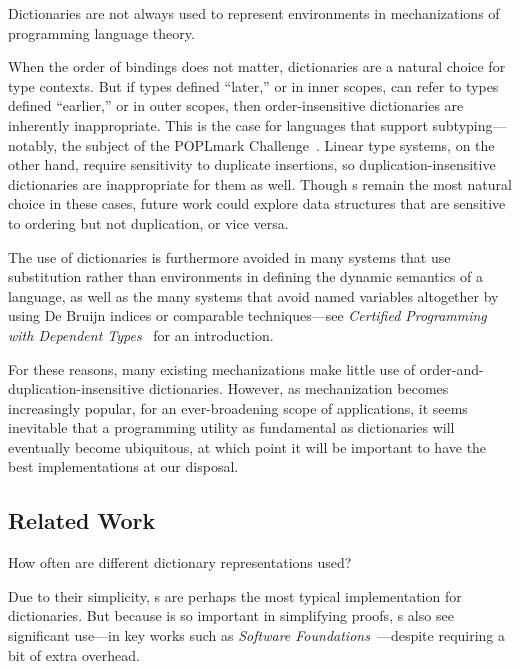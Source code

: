 
Dictionaries are not always used to represent environments in mechanizations of programming language theory.

When the order of bindings does not matter, dictionaries are a natural choice for type contexts.
%
But if types defined ``later,'' or in inner scopes, can refer to types defined ``earlier,'' or in outer scopes, then order-insensitive dictionaries are inherently inappropriate.
%
This is the case for languages that support subtyping---notably, the subject of the POPLmark Challenge~\citep{POPLmark}.
%
Linear type systems, on the other hand, require sensitivity to duplicate insertions, so duplication-insensitive dictionaries are inappropriate for them as well.
%
Though {\sal}s remain the most natural choice in these cases, future work could explore data structures that are sensitive to ordering but not duplication, or vice versa.

The use of dictionaries is furthermore avoided in many systems that use substitution rather than environments
%
in defining the dynamic semantics of a language, as well as the many systems that avoid named variables altogether by using De Bruijn indices or comparable techniques---see \emph{Certified Programming with Dependent Types}~\cite[Library Firstorder]{cpdt} for an introduction.

For these reasons, many existing mechanizations make little use of order-and-duplication-insensitive dictionaries. 
%
However, as mechanization becomes increasingly popular, for an ever-broadening scope of applications,
%
it seems inevitable that a programming utility as fundamental as dictionaries will eventually become ubiquitous, at which point it will be important to have the
%
best implementations at our disposal.

\subsection{Related Work}
\label{sec:Discussion:Related}

How often are different dictionary representations used?

%
Due to their simplicity, {\sal}s are perhaps the most typical implementation for dictionaries.
%
But because \SemInj{} is so important in simplifying proofs, {\fpf}s also see significant use---in key works such as \emph{Software Foundations}~\cite[Maps]{Pierce:SF1}---despite requiring a bit of extra overhead.

